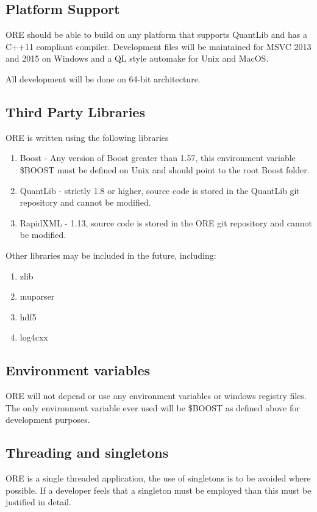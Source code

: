 \documentclass[12pt, a4paper]{article}
\begin{document}
\subsection*{Platform Support}
ORE should be able to build on any platform that supports QuantLib and has a C++11 compliant compiler. Development files will be maintained for MSVC 2013 and 2015 on Windows and a QL style automake for Unix and MacOS.

All development will be done on 64-bit architecture.

\subsection*{Third Party Libraries}
ORE is written using the following libraries
\begin{enumerate}
\item Boost - Any version of Boost greater than 1.57, this environment variable \$BOOST must be defined on Unix and should point to the root Boost folder.
\item QuantLib - strictly 1.8 or higher, source code is stored in the QuantLib git repository and cannot be modified.
\item RapidXML - 1.13, source code is stored in the ORE git repository and cannot be modified.
\end{enumerate}
Other libraries may be included in the future, including:
\begin{enumerate}
\item zlib
\item muparser
\item hdf5
\item log4cxx
\end{enumerate}

\subsection*{Environment variables}
ORE will not depend or use any environment variables or windows registry files. The only environment variable ever used will be \$BOOST as defined above for development purposes.

\subsection*{Threading and singletons}
ORE is a single threaded application, the use of singletons is to be avoided where possible. If a developer feels that a singleton must be employed than this must be justified in detail.
\end{document}
